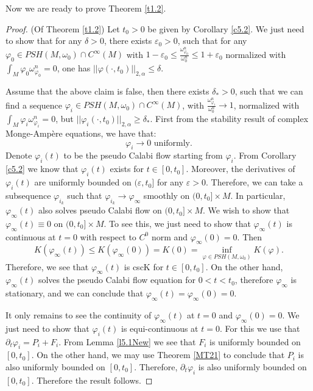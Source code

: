 \documentclass[11pt]{amsart}
\numberwithin{equation}{section}
\newcommand \eps{\varepsilon}
\begin{document}
Now we are ready to prove Theorem \ref{t1.2}.
\begin{proof}
(Of Theorem \ref{t1.2}) Let $t_0>0$ be given by Corollary \ref{c5.2}.  We just need to show that for any $\delta>0$,  there exists $\eps_0>0$,  such that for any $\varphi_0\in PSH(M,\omega_0)\cap C^{\infty}(M)$ with $1-\eps_0\le \frac{\omega_{\varphi_0}^n}{\omega_0^n}\le 1+\eps_0$ normalized with $\int_M\varphi_0\omega_{\varphi_0}^n=0$,  one has $||\varphi(\cdot,t_0)||_{2,\alpha}\le \delta$.  

Assume that the above claim is false,  then there exists $\delta_*>0$,  such that we can find a sequence $\varphi_i\in PSH(M,\omega_0)\cap C^{\infty}(M)$,  with $\frac{\omega_{\varphi_i}^n}{\omega_0^n}\rightarrow 1$,  normalized with $\int_M\varphi_i\omega_{\varphi_i}^n=0$,  but $||\varphi_i(\cdot,t_0)||_{2,\alpha}\ge \delta_*$.  First from the stability result of complex Monge-Ampère equations,  we have that:
\begin{equation*}
\varphi_i\rightarrow 0\text{ uniformly}.
\end{equation*}
Denote $\varphi_i(t)$ to be the pseudo Calabi flow starting from $\varphi_i$.  From Corollary \ref{c5.2} we know that $\varphi_i(t)$ exists for $t\in [0,t_0]$.  Moreover,  the derivatives of $\varphi_i(t)$ are uniformly bounded on $(\eps,t_0]$ for any $\eps>0$.  Therefore,  we can take a subsequence $\varphi_{i_k}$ such that $\varphi_{i_k}\rightarrow \varphi_{\infty}$ smoothly on $(0,t_0]\times M$.  In particular,  $\varphi_{\infty}(t)$ also solves pseudo Calabi flow on $(0,t_0]\times M$.  We wish to show that $\varphi_{\infty}(t)\equiv 0$ on $(0,t_0]\times M$.  To see this,  we just need to show that $\varphi_{\infty}(t)$ is continuous at $t=0$ with respect to $C^0$ norm and $\varphi_{\infty}(0)=0$.  Then 
\begin{equation*}
K(\varphi_{\infty}(t))\le K(\varphi_{\infty}(0))=K(0)=\inf_{\varphi\in PSH(M,\omega_0)}K(\varphi).
\end{equation*}
Therefore,  we see that $\varphi_{\infty}(t)$ is cscK for $t\in [0,t_0]$.  On the other hand,  $\varphi_{\infty}(t)$ solves the pseudo Calabi flow equation for $0<t<t_0$,  therefore $\varphi_{\infty}$ is stationary,  and we can conclude that $\varphi_{\infty}(t)=\varphi_{\infty}(0)=0$.

It only remains to see the continuity of $\varphi_{\infty}(t)$ at $t=0$ and $\varphi_{\infty}(0)=0$.  We just need to show that $\varphi_i(t)$ is equi-continuous at $t=0$.  For this we use that $\partial_t\varphi_i=P_i+F_i$.  From Lemma \ref{l5.1New} we see that $F_i$ is uniformly bounded on $[0,t_0]$.  On the other hand, we may use Theorem \ref{MT21} to conclude that $P_i$ is also uniformly bounded on $[0,t_0]$.  Therefore,  $\partial_t\varphi_i$ is also uniformly bounded on $[0,t_0]$.  Therefore the result follows.
\end{proof}
\end{document}
